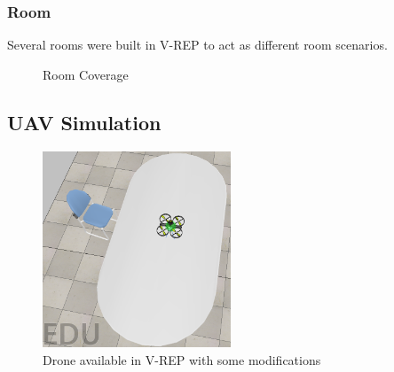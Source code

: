 \subsubsection{Room}

Several rooms were built in V-REP to act as different room scenarios.

\begin{figure}
  \centering
  \hfill
  \caption{Room Coverage}
  
  \label{fig:final_room}
\end{figure}

\vfill
\hfill

\subsection{UAV Simulation}
\begin{figure}[!]

  \includegraphics[width=0.5\textwidth]{figures/Drone_VREP.png}
  \caption{Drone available in V-REP with some modifications}
  
  \label{fig:drone_vrep}  
\end{figure}

